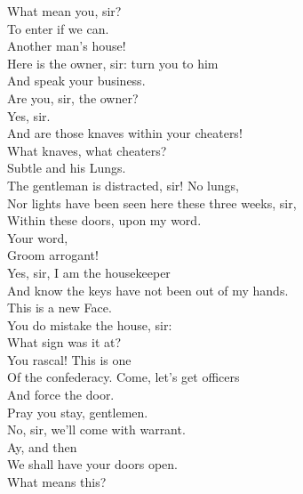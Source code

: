 \documentclass[a4paper,oneside,12pt]{memoir}
\begin{document}
\begin{drama*}
\facespeaks {} What mean you, sir?\\
\mammonspeaks To enter if we can.\\
\facespeaks {} Another man's house!\\
Here is the owner, sir: turn you to him\\
And speak your business.\\
\mammonspeaks {} Are you, sir, the owner?\\
\lovewitspeaks Yes, sir.\\
\mammonspeaks {} And are those knaves within your cheaters!\\
\lovewitspeaks What knaves, what cheaters?\\
\mammonspeaks {} Subtle and his Lungs.\\
\facespeaks The gentleman is distracted, sir! No lungs,\\
Nor lights have been seen here these three weeks, sir,\\
Within these doors, upon my word.\\
\surlyspeaks {} Your word,\\
Groom arrogant!\\
\facespeaks {} Yes, sir, I am the housekeeper\\
And know the keys have not been out of my hands.\\
\surlyspeaks This is a new Face.\\
\facespeaks {} You do mistake the house, sir:\\
What sign was it at?\\
\surlyspeaks {} You rascal! This is one\\
Of the confederacy. Come, let's get officers\\
And force the door.\\
\lovewitspeaks {} Pray you stay, gentlemen.\\
\surlyspeaks No, sir, we'll come with warrant.\\
\mammonspeaks {} Ay, and then\\
We shall have your doors open.\\
\lovewitspeaks {} What means this?\\

\end{drama*}
\end{document}
